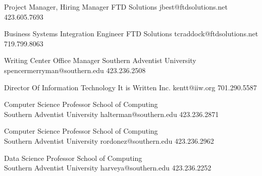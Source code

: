 \begin{multicols}{2}

{Project Manager, Hiring Manager}
{FTD Solutions}
{jbest@ftdsolutions.net}
{423.605.7693}

{Business Systems Integration Engineer}
{FTD Solutions}
{tcraddock@ftdsolutions.net}
{719.799.8063}

{Writing Center Office Manager}
{Southern Adventist University}
{spencermerryman@southern.edu}
{423.236.2508}


{Director Of Information Technology}
{It is Written Inc.}
{kentt@iiw.org}
{701.290.5587}

\columnbreak
{}
{Computer Science Professor}
{School of Computing\\Southern Adventist University}
{halterman@southern.edu}
{423.236.2871}

{Computer Science Professor}
{School of Computing\\Southern Adventist University}
{rordonez@southern.edu}
{423.236.2962}

{Data Science Professor}
{School of Computing\\Southern Adventist University}
{harveya@southern.edu}
{423.236.2252}

\end{multicols}